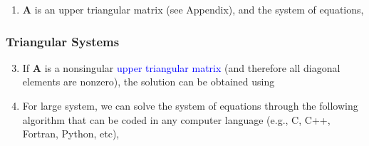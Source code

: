 \documentclass[10pt,compress,handout,ignorenonframetext]{beamer}
\begin{document}
\begin{frame}
\begin{enumerate}
{}
    \item <2-> $\bm{A}$ is an upper triangular matrix (see Appendix), and  the system of equations, 
% 
  \end{enumerate}
\end{frame}

\begin{frame}
  \frametitle{Triangular Systems} 
  \begin{enumerate}
  \setcounter{enumi}{2}
    \item <1-> If $\bm{A}$ is a nonsingular \textcolor{blue}{upper triangular matrix} (and therefore all diagonal elements are nonzero), the solution can be obtained using
    \item <3-> For large system, we can solve the system of equations through the following algorithm that can be coded in any computer language (e.g., C, C++, Fortran, Python, etc),
  \end{enumerate}
\end{frame}
\end{document}
